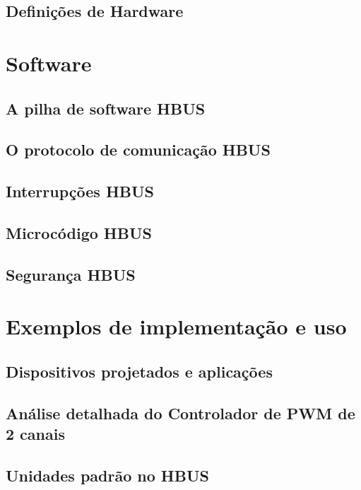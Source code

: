\documentclass[11pt]{report}
\begin{document}
\chapter{Definições de Hardware}



\part{Software}

\chapter{A pilha de software HBUS}



\chapter{O protocolo de comunicação HBUS}



\chapter{Interrupções HBUS}



\chapter{Microcódigo HBUS}



\chapter{Segurança HBUS}



\part{Exemplos de implementação e uso}

\chapter{Dispositivos projetados e aplicações}



\chapter{Análise detalhada do Controlador de PWM de 2 canais}



\appendix
\chapter{Unidades padrão no HBUS}


\end{document}

